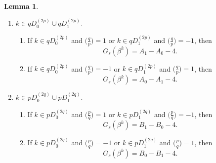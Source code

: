 \documentclass{mcom-l}
\theoremstyle{definition}
\newtheorem{sec3lemma9}[sec3lemma1]{Lemma}
\numberwithin{equation}{section}
\begin{document}
\begin{sec3lemma9}
\begin{enumerate}
\begin{enumerate}
  \begin{equation*}
  G_{s}(\beta^{k})=2(A_{0}B_{0}+A_{1}B_{1}-1).
  \end{equation*}
  \item
  If $ k\in 2D_{0}^{(T)} $ and $ \biggl(\frac{q}{p}\biggr)=\biggl(\frac{p}{q}\biggr) $ or $ k\in 2D_{1}^{(T)} $ and $ \biggl(\frac{q}{p}\biggr)=-\biggl(\frac{p}{q}\biggr) $, then
  \begin{equation*}
  G_{s}(\beta^{k})=2(A_{0}B_{1}+A_{1}B_{0}-1).
  \end{equation*}
  \end{enumerate}
  \item $ k\in qD_{0}^{(2p)}\cup qD_{1}^{(2p)} $.
  \begin{enumerate}
  \item
  If $ k\in qD_{0}^{(2p)} $ and $ \biggl(\frac{q}{p}\biggr)=1 $ or $ k\in qD_{1}^{(2p)} $ and $ \biggl(\frac{q}{p}\biggr)=-1 $, then
  \begin{equation*}
  G_{s}(\beta^{k})=A_{1}-A_{0}-4.
  \end{equation*}
  \item
  If $ k\in qD_{0}^{(2p)} $ and $ \biggl(\frac{q}{p}\biggr)=-1 $ or $ k\in qD_{1}^{(2p)} $ and $ \biggl(\frac{q}{p}\biggr)=1 $, then
  \begin{equation*}
  G_{s}(\beta^{k})=A_{0}-A_{1}-4.
  \end{equation*}
  \end{enumerate}
  \item $ k\in pD_{0}^{(2q)}\cup pD_{1}^{(2q)} $.
  \begin{enumerate}
  \item
  If $ k\in pD_{0}^{(2q)} $ and $ \biggl(\frac{p}{q}\biggr)=1 $ or $ k\in pD_{1}^{(2q)} $ and $ \biggl(\frac{p}{q}\biggr)=-1 $, then
  \begin{equation*}
  G_{s}(\beta^{k})=B_{1}-B_{0}-4.
  \end{equation*}
  \item
  If $ k\in pD_{0}^{(2q)} $ and $ \biggl(\frac{p}{q}\biggr)=-1 $ or $ k\in pD_{1}^{(2q)} $ and $ \biggl(\frac{p}{q}\biggr)=1 $, then
  \begin{equation*}
  G_{s}(\beta^{k})=B_{0}-B_{1}-4.
  \end{equation*}
  \end{enumerate}
  \end{enumerate}
  \end{sec3lemma9}
\end{document}
